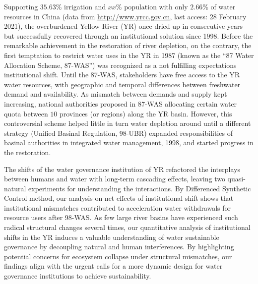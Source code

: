 Supporting $35.63\%$ irrigation and $xx\%$ population with only $2.66\%$ of water resources in China (data from \href{http://www.yrcc.gov.cn}{http://www.yrcc.gov.cn}, last access: 28 February 2021), the overburdened Yellow River (YR) once dried up in consecutive years but successfully recovered through an institutional solution since 1998.
Before the remarkable achievement in the restoration of river depletion, on the contrary, the first temptation to restrict water uses in the YR in 1987 (known as the ``87 Water Allocation Scheme, 87-WAS'') was recognized as a not fulfilling expectations institutional shift.
Until the 87-WAS, stakeholders have free access to the YR water resources, with geographic and temporal differences between freshwater demand and availability.
As mismatch between demands and supply kept increasing, national authorities proposed in 87-WAS allocating certain water quota between $10$ provinces (or regions) along the YR basin.
However, this controversial scheme helped little in turn water depletion around until a different strategy (Unified Basinal Regulation, 98-UBR) expanded responsibilities of basinal authorities in integrated water management, 1998, and started progress in the restoration.

The shifts of the water governance institution of YR refactored the interplays between humans and water with long-term cascading effects, leaving two quasi-natural experiments for understanding the interactions.
By Differenced Synthetic Control method, our analysis on net effects of institutional shift shows that institutional mismatches contributed to acceleration water withdrawals for resource users after 98-WAS.
As few large river basins have experienced such radical structural changes several times, our quantitative analysis of institutional shifts in the YR induces a valuable understanding of water sustainable governance by decoupling natural and human interferences.
By highlighting potential concerns for ecosystem collapse under structural mismatches, our findings align with the urgent calls for a more dynamic design for water governance institutions to achieve sustainability.
